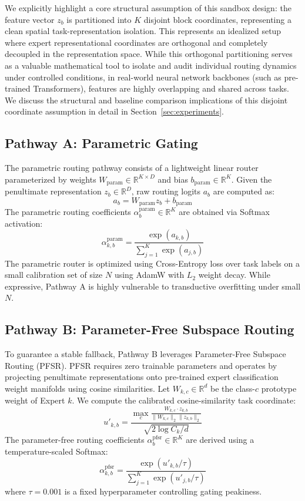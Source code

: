 We explicitly highlight a core structural assumption of this sandbox design: the feature vector $z_b$ is partitioned into $K$ disjoint block coordinates, representing a clean spatial task-representation isolation. This represents an idealized setup where expert representational coordinates are orthogonal and completely decoupled in the representation space. While this orthogonal partitioning serves as a valuable mathematical tool to isolate and audit individual routing dynamics under controlled conditions, in real-world neural network backbones (such as pre-trained Transformers), features are highly overlapping and shared across tasks. We discuss the structural and baseline comparison implications of this disjoint coordinate assumption in detail in Section~\ref{sec:experiments}.

\subsection{Pathway A: Parametric Gating}
The parametric routing pathway consists of a lightweight linear router parameterized by weights $W_{\text{param}} \in \mathbb{R}^{K \times D}$ and bias $b_{\text{param}} \in \mathbb{R}^K$. Given the penultimate representation $z_b \in \mathbb{R}^D$, raw routing logits $a_b$ are computed as:
\begin{equation}
a_b = W_{\text{param}} z_b + b_{\text{param}}
\end{equation}
The parametric routing coefficients $\alpha^{\text{param}}_b \in \mathbb{R}^K$ are obtained via Softmax activation:
\begin{equation}
\alpha^{\text{param}}_{k, b} = \frac{\exp(a_{k, b})}{\sum_{j=1}^K \exp(a_{j, b})}
\end{equation}
The parametric router is optimized using Cross-Entropy loss over task labels on a small calibration set of size $N$ using AdamW with $L_2$ weight decay. While expressive, Pathway A is highly vulnerable to transductive overfitting under small $N$.

\subsection{Pathway B: Parameter-Free Subspace Routing}
To guarantee a stable fallback, Pathway B leverages Parameter-Free Subspace Routing (PFSR). PFSR requires zero trainable parameters and operates by projecting penultimate representations onto pre-trained expert classification weight manifolds using cosine similarities. Let $W_{k, c} \in \mathbb{R}^d$ be the class-$c$ prototype weight of Expert $k$. We compute the calibrated cosine-similarity task coordinate:
\begin{equation}
u'_{k, b} = \frac{\max_{c} \frac{W_{k, c} \cdot z_{k, b}}{\|W_{k, c}\|_2 \|z_{k, b}\|_2}}{\sqrt{2\log C_k / d}}
\end{equation}
The parameter-free routing coefficients $\alpha^{\text{pfsr}}_b \in \mathbb{R}^K$ are derived using a temperature-scaled Softmax:
\begin{equation}
\alpha^{\text{pfsr}}_{k, b} = \frac{\exp(u'_{k, b} / \tau)}{\sum_{j=1}^K \exp(u'_{j, b} / \tau)}
\end{equation}
where $\tau = 0.001$ is a fixed hyperparameter controlling gating peakiness.


